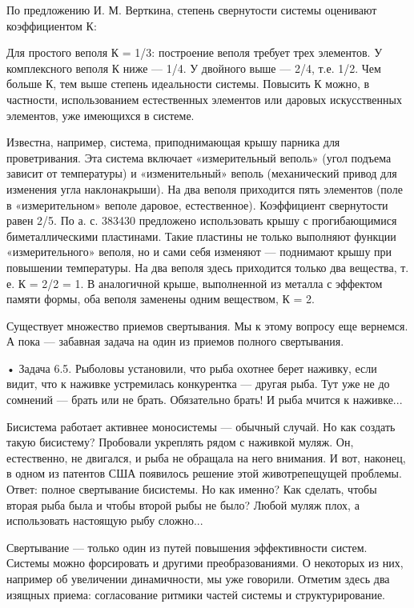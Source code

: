 По предложению  И. М. Верткина, степень  свернутости системы оценивают
коэффициентом К:


Для простого веполя К = 1/3: построение веполя требует трех элементов.
У комплексного веполя К  ниже — 1/4. У двойного выше  — 2/4, т.е. 1/2.
Чем  больше  К,  тем  выше степень  идеальности  системы.  Повысить  К
можно, в частности, использованием  естественных элементов или даровых
искусственных элементов, уже имеющихся в системе.

Известна,   например,  система,   приподнимающая  крышу   парника  для
проветривания.  Эта  система  включает  «измерительный  веполь»  (угол
подъема зависит от температуры) и «изменительный» веполь (механический
привод для изменения угла наклонакрыши). На два веполя приходится пять
элементов  (поле  в  «измерительном»  веполе  даровое,  естественное).
Коэффициент  свернутости  равен  2/5.   По  а.  с.  383430  предложено
использовать крышу с прогибающимися биметаллическими пластинами. Такие
пластины  не только  выполняют функции  «измерительного» веполя,  но и
сами себя изменяют — поднимают крышу при повышении температуры. На два
веполя здесь  приходится только  два вещества, т.  е. К =  2/2 =  1. В
аналогичной крыше, выполненной из металла с эффектом памяти формы, оба
веполя заменены одним веществом, К = 2.


Существует  множество  приемов свертывания.  Мы  к  этому вопросу  еще
вернемся.  А  пока  —  забавная  задача на  один  из  приемов  полного
свертывания.

• Задача  6.5. Рыболовы  установили, что  рыба охотнее  берет наживку,
если видит, что  к наживке устремилась конкурентка —  другая рыба. Тут
уже не  до сомнений —  брать или не  брать. Обязательно брать!  И рыба
мчится к наживке...

Бисистема  работает  активнее моносистемы  —  обычный  случай. Но  как
создать такую  бисистему? Пробовали укреплять рядом  с наживкой муляж.
Он, естественно,  не двигался,  и рыба не  обращала на  него внимания.
И  вот,  наконец, в  одном  из  патентов  США появилось  решение  этой
животрепещущей проблемы.  Ответ: полное свертывание бисистемы.  Но как
именно? Как  сделать, чтобы вторая  рыба была  и чтобы второй  рыбы не
было? Любой муляж плох, а использовать настоящую рыбу сложно...


Свертывание  — только  один из  путей повышения  эффективности систем.
Системы можно  форсировать и другими преобразованиями.  О некоторых из
них,  например об  увеличении динамичности,  мы уже  говорили. Отметим
здесь  два  изящных  приема:  согласование ритмики  частей  системы  и
структурирование.


